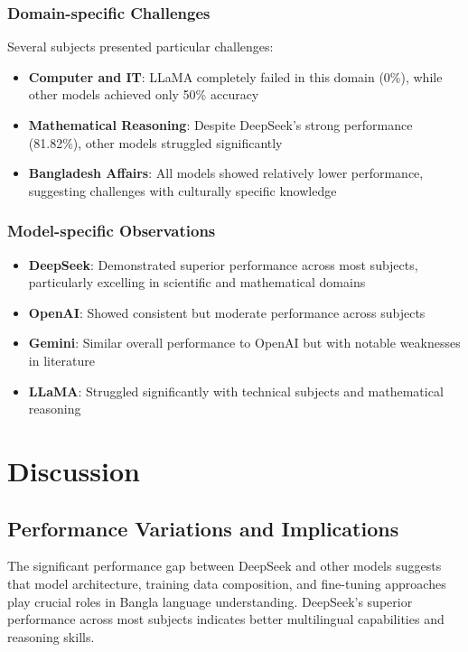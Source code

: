 \documentclass[11pt,a4paper]{article}
\begin{document}
\subsubsection{Domain-specific Challenges}

Several subjects presented particular challenges:

\begin{itemize}
    \item \textbf{Computer and IT}: LLaMA completely failed in this domain (0\%), while other models achieved only 50\% accuracy
    \item \textbf{Mathematical Reasoning}: Despite DeepSeek's strong performance (81.82\%), other models struggled significantly
    \item \textbf{Bangladesh Affairs}: All models showed relatively lower performance, suggesting challenges with culturally specific knowledge
\end{itemize}

\subsubsection{Model-specific Observations}

\begin{itemize}
    \item \textbf{DeepSeek}: Demonstrated superior performance across most subjects, particularly excelling in scientific and mathematical domains
    \item \textbf{OpenAI}: Showed consistent but moderate performance across subjects
    \item \textbf{Gemini}: Similar overall performance to OpenAI but with notable weaknesses in literature
    \item \textbf{LLaMA}: Struggled significantly with technical subjects and mathematical reasoning
\end{itemize}

\section{Discussion}

\subsection{Performance Variations and Implications}

The significant performance gap between DeepSeek and other models suggests that model architecture, training data composition, and fine-tuning approaches play crucial roles in Bangla language understanding. DeepSeek's superior performance across most subjects indicates better multilingual capabilities and reasoning skills.
\end{document}
